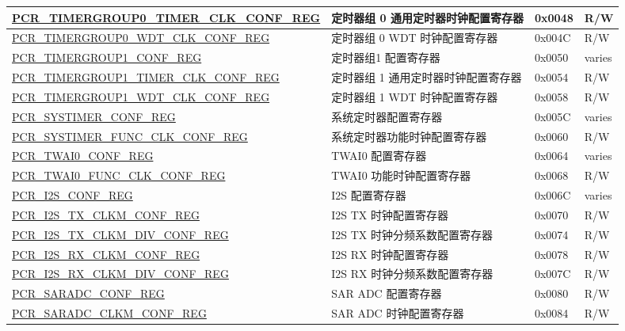 \begin{longtable}{ | p{7.2cm} | p{6cm} | p{1.3cm} | p{1cm} | }
\hyperref[regdesc:PCRTIMERGROUP0TIMERCLKCONFREG]{PCR\_TIMERGROUP0\_TIMER\_CLK\_CONF\_REG} & 定时器组 0  通用定时器时钟配置寄存器 & 0x0048 & R/W \\ \hline
\hyperref[regdesc:PCRTIMERGROUP0WDTCLKCONFREG]{PCR\_TIMERGROUP0\_WDT\_CLK\_CONF\_REG} & 定时器组 0 WDT 时钟配置寄存器 & 0x004C & R/W \\ \hline
\hyperref[regdesc:PCRTIMERGROUP1CONFREG]{PCR\_TIMERGROUP1\_CONF\_REG} & 定时器组1 配置寄存器 & 0x0050 & varies \\ \hline
\hyperref[regdesc:PCRTIMERGROUP1TIMERCLKCONFREG]{PCR\_TIMERGROUP1\_TIMER\_CLK\_CONF\_REG} & 定时器组 1  通用定时器时钟配置寄存器 & 0x0054 & R/W \\ \hline
\hyperref[regdesc:PCRTIMERGROUP1WDTCLKCONFREG]{PCR\_TIMERGROUP1\_WDT\_CLK\_CONF\_REG} & 定时器组 1 WDT 时钟配置寄存器 & 0x0058 & R/W \\ \hline
\hyperref[regdesc:PCRSYSTIMERCONFREG]{PCR\_SYSTIMER\_CONF\_REG} & 系统定时器配置寄存器 & 0x005C & varies \\ \hline
\hyperref[regdesc:PCRSYSTIMERFUNCCLKCONFREG]{PCR\_SYSTIMER\_FUNC\_CLK\_CONF\_REG} & 系统定时器功能时钟配置寄存器 & 0x0060 & R/W \\ \hline
\hyperref[regdesc:PCRTWAI0CONFREG]{PCR\_TWAI0\_CONF\_REG} & TWAI0 配置寄存器 & 0x0064 & varies \\ \hline
\hyperref[regdesc:PCRTWAI0FUNCCLKCONFREG]{PCR\_TWAI0\_FUNC\_CLK\_CONF\_REG} & TWAI0 功能时钟配置寄存器 & 0x0068 & R/W \\ \hline
\hyperref[regdesc:PCRI2SCONFREG]{PCR\_I2S\_CONF\_REG} & I2S 配置寄存器 & 0x006C & varies \\ \hline
\hyperref[regdesc:PCRI2STXCLKMCONFREG]{PCR\_I2S\_TX\_CLKM\_CONF\_REG} & I2S TX 时钟配置寄存器 & 0x0070 & R/W \\ \hline
\hyperref[regdesc:PCRI2STXCLKMDIVCONFREG]{PCR\_I2S\_TX\_CLKM\_DIV\_CONF\_REG} & I2S TX 时钟分频系数配置寄存器 & 0x0074 & R/W \\ \hline
\hyperref[regdesc:PCRI2SRXCLKMCONFREG]{PCR\_I2S\_RX\_CLKM\_CONF\_REG} & I2S RX 时钟配置寄存器 & 0x0078 & R/W \\ \hline
\hyperref[regdesc:PCRI2SRXCLKMDIVCONFREG]{PCR\_I2S\_RX\_CLKM\_DIV\_CONF\_REG} & I2S RX 时钟分频系数配置寄存器 & 0x007C & R/W \\ \hline
\hyperref[regdesc:PCRSARADCCONFREG]{PCR\_SARADC\_CONF\_REG} & SAR ADC 配置寄存器 & 0x0080 & R/W \\ \hline
\hyperref[regdesc:PCRSARADCCLKMCONFREG]{PCR\_SARADC\_CLKM\_CONF\_REG} & SAR ADC 时钟配置寄存器 & 0x0084 & R/W \\ \hline

\end{longtable}
